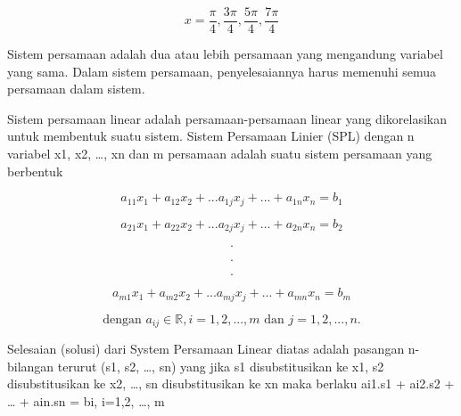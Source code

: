 \begin{eulernotebook}
\begin{eulercomment}
\begin{eulercomment}
\begin{eulercomment}
\end{eulercomment}
\begin{eulerformula}
\[
x = \frac{\pi}{4}, \frac{3\pi}{4}, \frac{5\pi}{4}, \frac{7\pi}{4}
\]
\end{eulerformula}
\begin{eulercomment}
\end{eulercomment}
\begin{eulercomment}
\begin{eulercomment}
\begin{eulercomment}
Sistem persamaan adalah dua atau lebih persamaan yang mengandung
variabel yang sama. Dalam sistem persamaan, penyelesaiannya harus
memenuhi semua persamaan dalam sistem.

\end{eulercomment}
\begin{eulercomment}
Sistem persamaan linear adalah persamaan-persamaan linear yang
dikorelasikan untuk membentuk suatu sistem. Sistem Persamaan Linier
(SPL) dengan n variabel x1, x2, …, xn dan m persamaan adalah suatu
sistem persamaan yang berbentuk

\end{eulercomment}
\begin{eulerformula}
\[
a_{11}x_{1}+a_{12}x_{2}+... a_{1j}x_{j}+...+a_{1n}x_{n}=b_{1}
\]
\end{eulerformula}
\begin{eulerformula}
\[
a_{21}x_{1}+a_{22}x_{2}+... a_{2j}x_{j}+...+a_{2n}x_{n}=b_{2}
\]
\end{eulerformula}
\begin{eulerformula}
\[
\text{.}
\]
\end{eulerformula}
\begin{eulerformula}
\[
\text{.}
\]
\end{eulerformula}
\begin{eulerformula}
\[
\text{.}
\]
\end{eulerformula}
\begin{eulerformula}
\[
a_{m1}x_{1}+a_{m2}x_{2}+...a_{mj}x_{j}+...+a_{mn}x_{n}=b_{m}
\]
\end{eulerformula}
\begin{eulercomment}
\end{eulercomment}
\begin{eulerformula}
\[
\text{dengan } a_{ij} \in \mathbb{R}, i=1,2,...,m \text{ dan } j=1,2,...,n.
\]
\end{eulerformula}
\begin{eulercomment}
Selesaian (solusi) dari System Persamaan Linear diatas adalah pasangan
n-bilangan terurut (s1, s2, …, sn) yang jika s1 disubstitusikan ke x1,
s2 disubstitusikan ke x2, …, sn disubstitusikan ke xn maka berlaku
ai1.s1 + ai2.s2 + … + ain.sn = bi, i=1,2, …, m


\end{eulercomment}
\end{eulercomment}
\end{eulercomment}
\end{eulercomment}
\end{eulercomment}
\end{eulernotebook}
